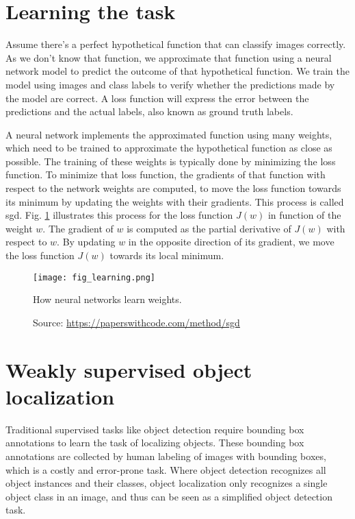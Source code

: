 \section{Learning the task}
Assume there's a perfect hypothetical function that can classify images correctly. As we don't know that function, we approximate that function using a neural network model to predict the outcome of that hypothetical function. We train the model using images and class labels to verify whether the predictions made by the model are correct. A loss function will express the error between the predictions and the actual labels, also known as ground truth labels.

A neural network implements the approximated function using many weights, which need to be trained to approximate the hypothetical function as close as possible. The training of these weights is typically done by minimizing the loss function. To minimize that loss function, the gradients of that function with respect to the network weights are computed, to move the loss function towards its minimum by updating the weights with their gradients. This process is called \acrfull{sgd}. Fig. \ref{fig:learning} illustrates this process for the loss function $J(w)$ in function of the weight $w$. The gradient of $w$ is computed as the partial derivative of $J(w)$ with respect to $w$. By updating $w$ in the opposite direction of its gradient, we move the loss function $J(w)$ towards its local minimum.
\begin{figure}[ht]
    \begin{center}       
    \texttt{[image: fig\_learning.png]}
    \caption[How neural networks learn weights]{How neural networks learn weights.}
    \caption*{Source: \href{https://paperswithcode.com/method/sgd}{https://paperswithcode.com/method/sgd}}
    \label{fig:learning}
    \end{center}
\end{figure}

\section{Weakly supervised object localization}
Traditional supervised tasks like object detection require bounding box annotations to learn the task of localizing objects. These bounding box annotations are collected by human labeling of images with bounding boxes, which is a costly and error-prone task. Where object detection recognizes all object instances and their classes, object localization only recognizes a single object class in an image, and thus can be seen as a simplified object detection task. 

